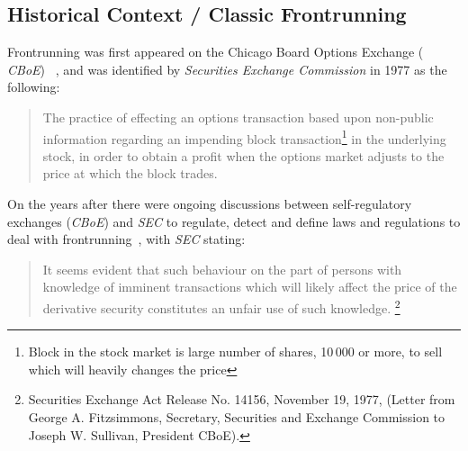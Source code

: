 \subsection{Historical Context / Classic Frontrunning}
Frontrunning was first appeared on the Chicago Board Options Exchange ( \textit{CBoE}) ~\cite{markham1988front}, and was identified by \textit{Securities Exchange Commission} in 1977 as the following:
\begin{quote}
The practice of effecting an options transaction based upon non-public information regarding an impending block transaction\footnote{Block in the stock market is large number of shares, 10\,000 or more, to sell which will heavily changes the price} in the underlying stock, in order to obtain a profit when the options market adjusts to the price at which the block trades. ~\cite{sec1978optionsmarket}
\end{quote} 



On the years after there were ongoing discussions between self-regulatory exchanges (\eg \textit{CBoE}) and  \textit{SEC} to regulate, detect and define laws and regulations to deal with frontrunning~\cite{markham1988front}, with \textit{SEC} stating: 
\begin{quote}
It seems evident that such behaviour on the part of persons with knowledge of imminent transactions which will likely affect the price of the derivative security constitutes an unfair use of such knowledge. \footnote{Securities Exchange Act Release No. 14156, November 19, 1977, (Letter from George A. Fitzsimmons, Secretary, Securities and Exchange Commission to Joseph W. Sullivan, President  CBoE).}
\end{quote} 

